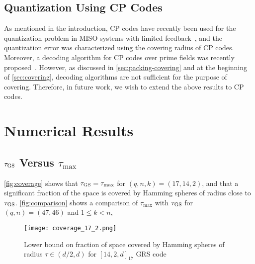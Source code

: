 \documentclass[conference]{IEEEtran}
\begin{document}
\subsection{Quantization Using CP Codes}
\label{sec:quantization}

As mentioned in the introduction, CP codes have recently been used for the quantization problem in MISO systems with limited feedback~\cite{gooty2025precodingdesignlimitedfeedbackmiso}, 
and the quantization error was characterized using the covering radius of CP codes. 
Moreover, a decoding algorithm for CP codes over prime fields was recently proposed~\cite{riasat2024decodinganalogsubspacecodes}. 
However, as discussed in \autoref{sec:packing-covering} and at the beginning of \autoref{sec:covering}, decoding algorithms are not sufficient for the purpose of covering. Therefore, in future work, we wish to extend the above results to CP codes. 

\section{Numerical Results}
\label{sec:simulation}

\subsection{$\tau_{\operatorname{GS}}$ Versus $\tau_{\max}$}

\autoref{fig:coverage} shows that $\tau_{\operatorname{GS}} = \tau_{\max}$ for $(q, n, k) = (17, 14, 2)$, and that a significant fraction of the space is covered by Hamming spheres of radius close to $\tau_{\operatorname{GS}}$. 
\autoref{fig:comparison} shows a comparison of $\tau_{\max}$ with $\tau_{\operatorname{GS}}$ for $(q, n) = (47, 46)$ and $1 \le k < n$, 

\begin{figure}[!htbp]
    \centering
    \texttt{[image: coverage\_17\_2.png]}
    \caption{Lower bound on fraction of space covered by Hamming spheres of radius $\tau \in (d / 2, d)$ for $[14, 2, d]_{17}$ GRS code%
    }
    \label{fig:coverage}
\end{figure}
\end{document}
